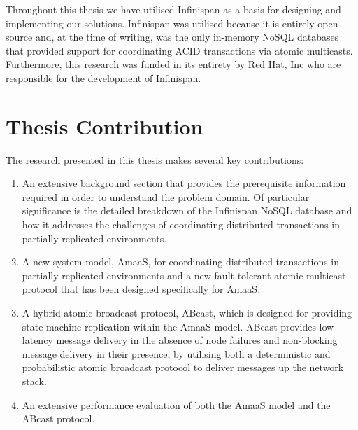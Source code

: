    Throughout this thesis we have utilised Infinispan as a basis for designing and implementing our solutions.  Infinispan was utilised because it is entirely open source and, at the time of writing, was the only in-memory NoSQL databases that provided support for coordinating ACID transactions via atomic multicasts.  Furthermore, this research was funded in its entirety by Red Hat, Inc who are responsible for the development of Infinispan.  
   
    \section{Thesis Contribution}
    The research presented in this thesis makes several key contributions:
    
	    \begin{enumerate}[label=\roman*]
	        \item An extensive background section that provides the prerequisite information required in order to understand the problem domain.  Of particular significance is the detailed breakdown of the Infinispan NoSQL database and how it addresses the challenges of coordinating distributed transactions in partially replicated environments.  
	        
	        \item A new system model, \textsf{AmaaS}, for coordinating distributed transactions in partially replicated environments and a new fault-tolerant atomic multicast protocol that has been designed specifically for \textsf{AmaaS}.  
	        
	        \item A hybrid atomic broadcast protocol, \textsf{ABcast}, which is designed for providing state machine replication within the \textsf{AmaaS} model.  \textsf{ABcast} provides low-latency message delivery in the absence of node failures and non-blocking message delivery in their presence, by utilising both a deterministic and probabilistic atomic broadcast protocol to deliver messages up the network stack.  
	        
	        \item An extensive performance evaluation of both the \textsf{AmaaS} model and the \textsf{ABcast} protocol.
	    \end{enumerate}
    
